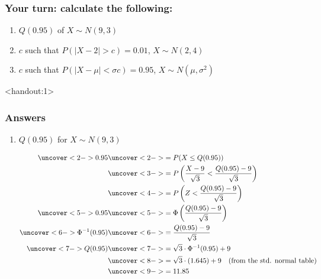 \documentclass[handout]{beamer}\usepackage[]{graphicx}\usepackage[]{color}
\newcommand{\answers}{1}
\providecommand{\nv}{{}^{-1}}
\numberwithin{equation}{section}
\begin{document}
\begin{frame}
\frametitle{Your turn: calculate the following:}
\begin{enumerate}[1. ]
\item $Q(0.95)$ of $X \sim N(9, 3)$
\item $c$ such that $P(|X - 2| > c) = 0.01$, $X \sim N(2, 4)$
\item $c$ such that $P(|X - \mu| < \sigma c) = 0.95$, $X \sim N(\mu, \sigma^2)$
\end{enumerate}
\end{frame}

\begin{frame}<handout:\answers>
\frametitle{Answers} \scriptsize
\begin{enumerate}[1. ]
\item $Q(0.95)$ for $X \sim N(9,3)$

\begin{align*}
\uncover<2->{0.95} & \uncover<2->{= P(X \le Q(0.95))} \\
&\uncover<3->{= P\left ( \frac{X - 9}{\sqrt{3}} < \frac{Q(0.95) - 9}{\sqrt{3}} \right )}  \\
&\uncover<4->{= P \left (Z < \frac{Q(0.95) - 9}{\sqrt{3}} \right )}  \\
\uncover<5->{0.95} & \uncover<5->{= \Phi \left (\frac{Q(0.95) - 9}{\sqrt{3}} \right )}  \\
\uncover<6->{\Phi \nv (0.95)} & \uncover<6->{= \frac{Q(0.95) - 9}{\sqrt{3}}}  \\
\uncover<7->{Q(0.95)} & \uncover<7->{= \sqrt{3} \cdot \Phi \nv (0.95) + 9} \\
&\uncover<8->{= \sqrt{3} \cdot (1.645) + 9 \quad \text{(from the std. normal table)}} \\
&\uncover<9->{= 11.85}
\end{align*}
\end{enumerate}
\end{frame}
\end{document}
